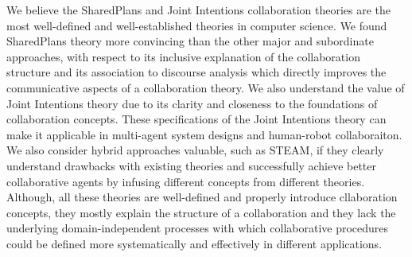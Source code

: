 \documentclass[11pt]{article}
\begin{document}
We believe the SharedPlans and Joint Intentions collaboration theories are the
most well-defined and well-established theories in computer science. We found
SharedPlans theory more convincing than the other major and subordinate
approaches, with respect to its inclusive explanation of the collaboration
structure and its association to discourse analysis which directly improves the
communicative aspects of a collaboration theory. We also understand the value of
Joint Intentions theory due to its clarity and closeness to the foundations of
collaboration concepts. These specifications of the Joint Intentions theory can
make it applicable in multi-agent system designs and human-robot collaboraiton.
We also consider hybrid approaches valuable, such as STEAM, if they clearly
understand drawbacks with existing theories and successfully achieve better
collaborative agents by infusing different concepts from different theories.
Although, all these theories are well-defined and properly introduce
cllaboration concepts, they mostly explain the structure of a collaboration and
they lack the underlying domain-independent processes with which collaborative
procedures could be defined more systematically and effectively in different
applications.\\



\end{document}
